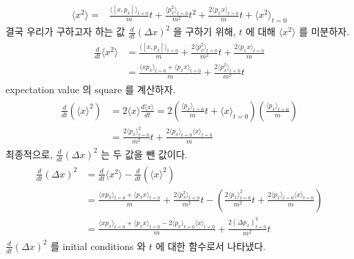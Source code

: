 \documentclass[floatfix,nofootinbib,superscriptaddress,fleqn]{revtex4}
\begin{document}
\begin{itemize}
\begin{align}
    \langle x^2 \rangle 
    =&\frac{\langle[x,p_x]\rangle_{t=0}}{m}t
    +\frac{\langle p_x^2\rangle_{t=0}}{m^2}t^2
    +\frac{2\langle p_xx\rangle_{t=0}}{m}t
    +\langle x^2\rangle_{t=0}
  \end{align}
결국 우리가 구하고자 하는 값 $\frac{d}{dt}(\Delta x)^2 $ 을 구하기 위해, 
$t$ 에 대해 $\langle x^2 \rangle$ 를 미분하자.
  \begin{align}
    \begin{split}
      \frac{d}{dt}\langle x^2\rangle 
      &=\frac{\langle[x,p_x]\rangle_{t=0}}{m}
      +\frac{2\langle p_x^2\rangle_{t=0}}{m^2}t
      +\frac{2\langle p_xx\rangle_{t=0}}{m} \\
      &=\frac{\langle xp_x\rangle_{t=0}+\langle p_xx\rangle_{t=0}}{m}
      +\frac{2\langle p_x^2\rangle_{t=0}}{m^2}t
    \end{split}
  \end{align}
expectation value 의 square 를 계산하자.
  \begin{align}
    \begin{split}
      \frac{d}{dt}\left(\langle x \rangle^2\right) 
      &=2\langle x\rangle\frac{d\langle x\rangle}{dt}
      =2\left(\frac{\langle p_x\rangle_{t=0}}{m}t
      +\langle x\rangle_{t=0}\right)\left(
        \frac{\langle p_x\rangle_{t=0}}{m}\right)  \\
      &=\frac{2\langle p_x\rangle_{t=0}^2}{m^2}t
      +\frac{2\langle p_x\rangle_{t=0}\langle x\rangle_{t=0}}{m}
    \end{split}
  \end{align}
 최종적으로, $\frac{d}{dt}(\Delta x)^2 $ 는 두 값을 뺀 값이다.
  \begin{align}
    \begin{split}
      \frac{d}{dt}(\Delta x)^2 
      &=\frac{d}{dt}\langle x^2 \rangle
      -\frac{d}{dt}\left(\langle x \rangle^2\right) \\
      &=\frac{\langle xp_x\rangle_{t=0}+\langle p_xx\rangle_{t=0}}{m}
      +\frac{2\langle p_x^2\rangle_{t=0}}{m^2}t
      -\left(\frac{2\langle p_x\rangle_{t=0}^2}{m^2}t
      +\frac{2\langle p_x\rangle_{t=0}\langle x\rangle_{t=0}}{m}
      \right) \\
      &=\frac{\langle xp_x\rangle_{t=0}+\langle p_xx\rangle_{t=0}
      -2\langle p_x\rangle_{t=0}\langle x\rangle_{t=0}}{m}
      +\frac{2\left(\Delta p_x\right)^2_{t=0}}{m^2}t
    \end{split}
  \end{align}
  $\frac{d}{dt}(\Delta x)^2 $ 를 initial conditions 와 
  $t$ 에 대한 함수로서 나타냈다.
\end{itemize} 
\newpage
\end{document}
